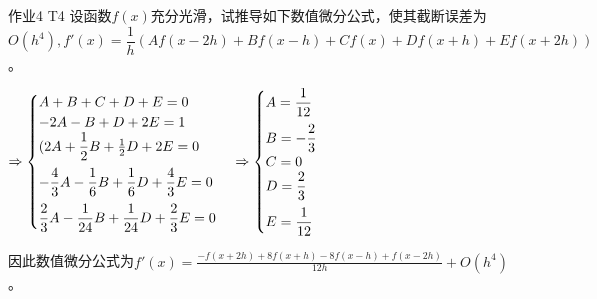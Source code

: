 \documentclass[10pt]{beamer}
\begin{document}
    \begin{frame}{作业4 T4}
        设函数$f(x)$充分光滑，试推导如下数值微分公式，使其截断误差为$O(h^4),f'(x)=\dfrac1h (Af(x-2h)+Bf(x-h)+Cf(x)+Df(x+h)+Ef(x+2h))$。\vspace{1cm}

        \pause $\Rightarrow\begin{cases}A+B+C+D+E=0\\-2A-B+D+2E=1\\(2A+\dfrac12 B+\frac12 D+2E=0\vspace{0.2cm}\\-\dfrac 43 A-\dfrac16 B+\dfrac16 D+\dfrac43 E=0\vspace{0.2cm}\\\dfrac 23 A-\dfrac1{24} B+\dfrac1{24} D+\dfrac23E=0\end{cases}\Rightarrow\begin{cases}A=\dfrac1{12} \vspace{0.2cm}\\B=-\dfrac23\\ C=0\\D=\dfrac23\vspace{0.2cm}\\E=\dfrac1{12}\end{cases}$

        \pause 因此数值微分公式为$f'(x)=\frac{-f(x+2h)+8f(x+h)-8f(x-h)+f(x-2h)}{12h}+O(h^4)$。
    \end{frame}
\end{document}
